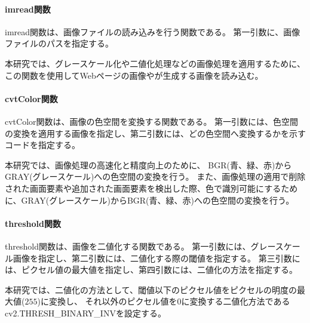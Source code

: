 \paragraph{imread関数}
imread関数は、画像ファイルの読み込みを行う関数である。
第一引数に、画像ファイルのパスを指定する。
\par
本研究では、グレースケール化や二値化処理などの画像処理を適用するために、
この関数を使用してWebページの画像や\toolName が生成する画像を読み込む。
\paragraph{cvtColor関数}
cvtColor関数は、画像の色空間を変換する関数である。
第一引数には、色空間の変換を適用する画像を指定し、第二引数には、どの色空間へ変換するかを示すコード\cite{ColorCode}を指定する。
\par
本研究では、画像処理の高速化と精度向上のために、
BGR(青、緑、赤)からGRAY(グレースケール)への色空間の変換を行う。
また、画像処理の適用で削除された画面要素や追加された画面要素を検出した際、色で識別可能にするために、GRAY(グレースケール)からBGR(青、緑、赤)への色空間の変換を行う。
\paragraph{threshold関数}
threshold関数は、画像を二値化する関数である。
第一引数には、グレースケール画像を指定し、第二引数には、二値化する際の閾値を指定する。
第三引数には、ピクセル値の最大値を指定し、第四引数には、二値化の方法を指定する。
\par
本研究では、二値化の方法として、閾値以下のピクセル値をピクセルの明度の最大値($255$)に変換し、
それ以外のピクセル値を$0$に変換する二値化方法であるcv2.THRESH\_BINARY\_INV\cite{Threshold}を設定する。
